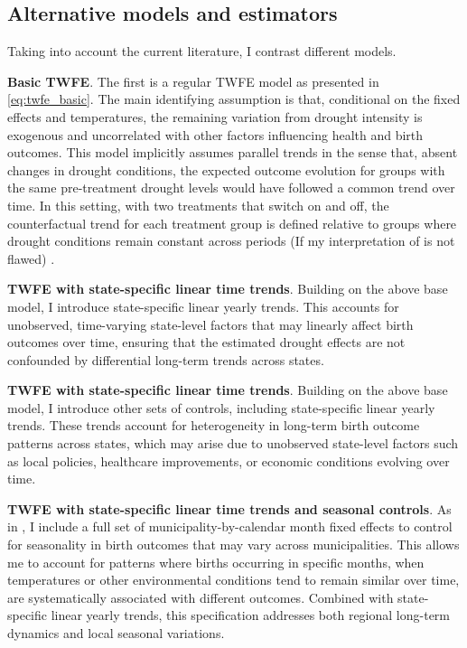 \subsection{Alternative models and estimators}

Taking into account the current literature, I contrast different models.

\textbf{Basic TWFE}. The first is a regular TWFE model as presented in \ref{eq:twfe_basic}. The main identifying assumption is that, conditional on the fixed effects and temperatures, the remaining variation from drought intensity is exogenous and uncorrelated with other factors influencing health and birth outcomes. This model implicitly assumes parallel trends in the sense that, absent changes in drought conditions, the expected outcome evolution for groups with the same pre-treatment drought levels would have followed a common trend over time. In this setting, with two treatments that switch on and off, the counterfactual trend for each treatment group is defined relative to groups where drought conditions remain constant across periods (If my interpretation of \cite{deChaisemartin20203} is not flawed) .

\textbf{TWFE with state-specific linear time trends}. Building on the above base model, I introduce state-specific linear yearly trends. This accounts for unobserved, time-varying state-level factors that may linearly affect birth outcomes over time, ensuring that the estimated drought effects are not confounded by differential long-term trends across states.

\textbf{TWFE with state-specific linear time trends}. Building on the above base model, I introduce other sets of controls, including state-specific linear yearly trends. These trends account for heterogeneity in long-term birth outcome patterns across states, which may arise due to unobserved state-level factors such as local policies, healthcare improvements, or economic conditions evolving over time. 

\textbf{TWFE with state-specific linear time trends and seasonal controls}. As in \cite{Cohen2022}, I include a full set of municipality-by-calendar month fixed effects to control for seasonality in birth outcomes that may vary across municipalities. This allows me to account for patterns where births occurring in specific months, when temperatures or other environmental conditions tend to remain similar over time, are systematically associated with different outcomes. Combined with state-specific linear yearly trends, this specification addresses both regional long-term dynamics and local seasonal variations.

